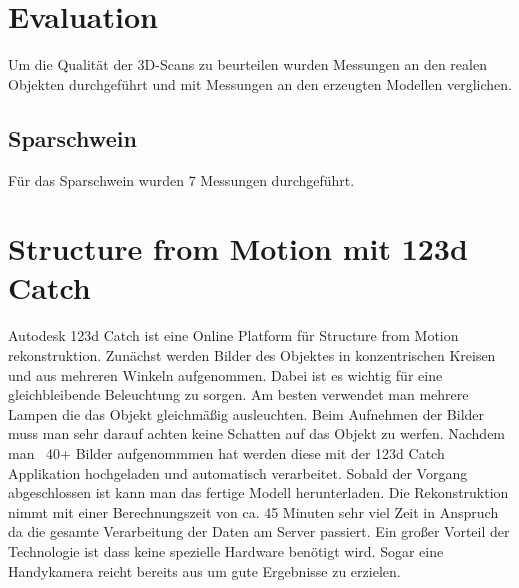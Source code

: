 \documentclass[]{article}
\begin{document}
\section{Evaluation}
Um die Qualität der 3D-Scans zu beurteilen wurden Messungen an den realen Objekten durchgeführt und mit Messungen an den erzeugten Modellen verglichen.

\subsection{}
\subsection{}
\subsection{Sparschwein}
Für das Sparschwein wurden 7 Messungen durchgeführt. 

\section{Structure from Motion mit 123d Catch} %

Autodesk 123d Catch ist eine Online Platform für Structure from Motion rekonstruktion. Zunächst werden Bilder des Objektes in konzentrischen Kreisen und aus mehreren Winkeln aufgenommen. Dabei ist es wichtig für eine gleichbleibende Beleuchtung zu sorgen. Am besten verwendet man mehrere Lampen die das Objekt gleichmäßig ausleuchten. Beim Aufnehmen der Bilder muss man sehr darauf achten keine Schatten auf das Objekt zu werfen. Nachdem man ~40+ Bilder aufgenommmen hat werden diese mit der 123d Catch Applikation hochgeladen und automatisch verarbeitet. Sobald der Vorgang abgeschlossen ist kann man das fertige Modell herunterladen. Die Rekonstruktion nimmt mit einer Berechnungszeit von ca. 45 Minuten sehr viel Zeit in Anspruch da die gesamte Verarbeitung der Daten am Server passiert. Ein großer Vorteil der Technologie ist dass keine spezielle Hardware benötigt wird. Sogar eine Handykamera reicht bereits aus um gute Ergebnisse zu erzielen.

\subsection{}
\subsection{}
\end{document}

